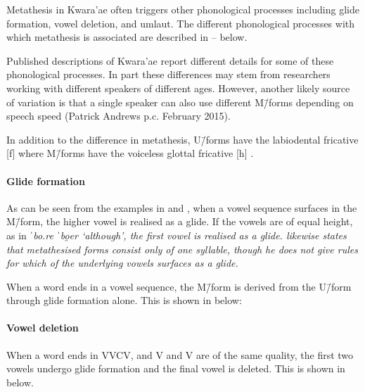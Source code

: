 Metathesis in Kwara'ae often triggers other phonological processes
including glide formation, vowel deletion, and umlaut.
The different phonological processes with which metathesis
is associated are described in -- below.

Published descriptions of Kwara'ae report different
details for some of these phonological processes.
In part these differences may stem from researchers working
with different speakers of different ages.
However, another likely source of variation
is that a single speaker can also use
different M\=/forms depending on speech speed
(Patrick Andrews p.c. February 2015).

In addition to the difference in metathesis,
U\=/forms have the labiodental fricative [f]
where M\=/forms have the voiceless glottal fricative [h] \citep[18]{he04}.

\paragraph{Glide formation}\label{sec:KwaGliFor}
As can be seen from the examples in  and ,
when a vowel sequence surfaces in the M\=/form,
the higher vowel is realised as a glide. %
If the vowels are of equal height,
as in \it{ˈbo.re} {\ra} \it{ˈbo̯er} `although',
the first vowel is realised as a glide.
\citet[319]{so80} likewise states that metathesised forms consist only of one syllable,
though he does not give rules for which of the underlying vowels surfaces as a glide.

When a word ends in a vowel sequence,
the M\=/form is derived from the U\=/form through glide formation alone.
This is shown in  below:

\begin{exe}
\label{KwaVV}
\end{exe}

\paragraph{Vowel deletion}
When a word ends in VVCV,
and V and V are of the same quality,
the first two vowels undergo glide formation and
the final vowel is deleted.
This is shown in  below.

